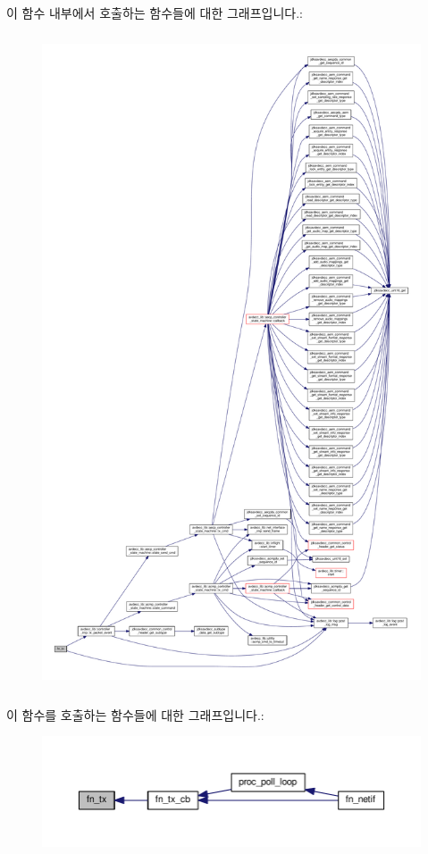 이 함수 내부에서 호출하는 함수들에 대한 그래프입니다.\+:
\nopagebreak
\begin{figure}[H]
\begin{center}
\leavevmode
\includegraphics[height=550pt]{classavdecc__lib_1_1system__layer2__multithreaded__callback_a7fee5b5184ef1af0d14bd5451b62516d_cgraph}
\end{center}
\end{figure}




이 함수를 호출하는 함수들에 대한 그래프입니다.\+:
\nopagebreak
\begin{figure}[H]
\begin{center}
\leavevmode
\includegraphics[width=350pt]{classavdecc__lib_1_1system__layer2__multithreaded__callback_a7fee5b5184ef1af0d14bd5451b62516d_icgraph}
\end{center}
\end{figure}


